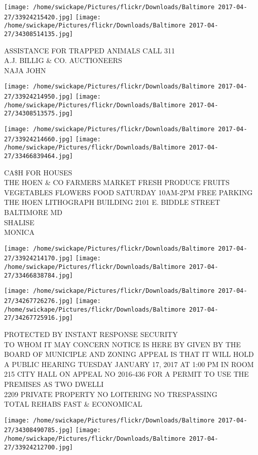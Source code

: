 \documentclass[10pt,letterpaper]{article}
\begin{document}
\vspace{0.25in}
\texttt{[image: /home/swickape/Pictures/flickr/Downloads/Baltimore 2017-04-27/33924215420.jpg]}
\texttt{[image: /home/swickape/Pictures/flickr/Downloads/Baltimore 2017-04-27/34308514135.jpg]}

ASSISTANCE FOR TRAPPED ANIMALS CALL 311\\
A.J. BILLIG \& CO. AUCTIONEERS\\
NAJA JOHN
\pagebreak

\texttt{[image: /home/swickape/Pictures/flickr/Downloads/Baltimore 2017-04-27/33924214950.jpg]}
\texttt{[image: /home/swickape/Pictures/flickr/Downloads/Baltimore 2017-04-27/34308513575.jpg]}

\texttt{[image: /home/swickape/Pictures/flickr/Downloads/Baltimore 2017-04-27/33924214660.jpg]}
\texttt{[image: /home/swickape/Pictures/flickr/Downloads/Baltimore 2017-04-27/33466839464.jpg]}

CA\$H FOR HOUSES\\
THE HOEN \& CO FARMERS MARKET  FRESH PRODUCE FRUITS VEGETABLES FLOWERS FOOD SATURDAY 10AM{-}2PM FREE PARKING THE HOEN LITHOGRAPH BUILDING 2101 E. BIDDLE STREET BALTIMORE MD\\
SHALISE\\
MONICA
\pagebreak

\texttt{[image: /home/swickape/Pictures/flickr/Downloads/Baltimore 2017-04-27/33924214170.jpg]}
\texttt{[image: /home/swickape/Pictures/flickr/Downloads/Baltimore 2017-04-27/33466838784.jpg]}

\texttt{[image: /home/swickape/Pictures/flickr/Downloads/Baltimore 2017-04-27/34267726276.jpg]}
\texttt{[image: /home/swickape/Pictures/flickr/Downloads/Baltimore 2017-04-27/34267725916.jpg]}

PROTECTED BY INSTANT RESPONSE SECURITY\\
TO WHOM IT MAY CONCERN NOTICE IS HERE BY GIVEN BY THE BOARD OF MUNICIPLE AND ZONING APPEAL IS THAT IT WILL HOLD A PUBLIC HEARING TUESDAY JANUARY 17, 2017 AT 1:00 PM IN ROOM 215 CITY HALL ON APPEAL NO 2016{-}436 FOR A PERMIT TO USE THE PREMISES AS TWO DWELLI\\
2209 PRIVATE PROPERTY NO LOITERING NO TRESPASSING\\
TOTAL REHABS FAST \& ECONOMICAL
\pagebreak

\texttt{[image: /home/swickape/Pictures/flickr/Downloads/Baltimore 2017-04-27/34308490785.jpg]}
\texttt{[image: /home/swickape/Pictures/flickr/Downloads/Baltimore 2017-04-27/33924212700.jpg]}
\end{document}
